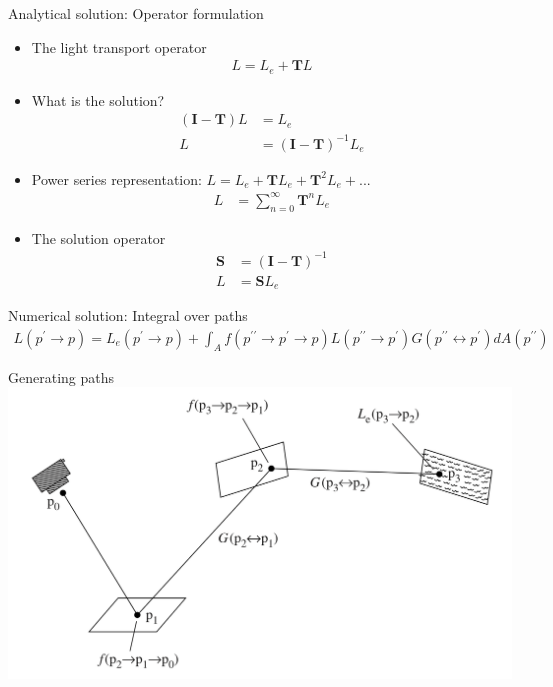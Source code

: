 \documentclass[pdf]
{beamer}
\begin{document}
\begin{frame}{Analytical solution: Operator formulation}
  \begin{itemize}
    \pause
  \item The light transport operator
    \begin{align*}
      L = L_e + \boldsymbol T L
    \end{align*}
    \pause
  \item What is the solution?
    \pause
    \begin{align*}
      (\boldsymbol I - \boldsymbol T) L & = L_e \\
      L & = (\boldsymbol I - \boldsymbol T)^{-1} L_e
    \end{align*}
    \pause
  \item Power series representation: $L = L_e + \boldsymbol T L_e + \boldsymbol T^{2} L_e + ...$
    \pause
    \begin{align*}
      L & = \sum_{n=0}^{\infty} \boldsymbol T^{n} L_e
    \end{align*}
    \pause
  \item The solution operator
    \begin{align*}
      \boldsymbol S & = (\boldsymbol I - \boldsymbol T)^{-1} \\
      L & = \boldsymbol S L_e
    \end{align*}
  \end{itemize}
\end{frame}

\begin{frame}{Numerical solution: Integral over paths}
  \small
  \begin{align*}
    L(p^{\prime} \to p) = L_e(p^{\prime} \to p) + \int_{A} f(p^{\prime\prime} \to p^{\prime} \to p) L(p^{\prime\prime} \to p^{\prime}) G(p^{\prime\prime} \leftrightarrow p^{\prime}) d A(p^{\prime\prime})
  \end{align*}
  \normalsize
\end{frame}

\begin{frame}{Generating paths}
\includegraphics[scale=0.4]{images/paths}
\end{frame}
\end{document}

